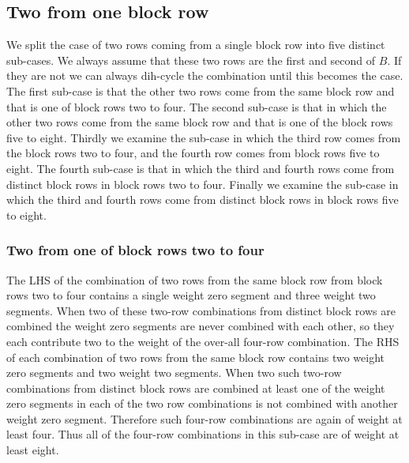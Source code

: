 \subsection{Two from one block row}
We split the case of two rows coming from a single block row into five distinct sub-cases.
We always assume that these two rows are the first and second of $B$.
If they are not we can always dih-cycle the combination until this becomes the case.
The first sub-case is that the other two rows come from the same block row and that is one of block rows two to four.
The second sub-case is that in which the other two rows come from the same block row and that is one of the block rows five to eight.
Thirdly we examine the sub-case in which the third row comes from the block rows two to four, and the fourth row comes from block rows five to eight.
The fourth sub-case is that in which the third and fourth rows come from distinct block rows in block rows two to four.
Finally we examine the sub-case in which the third and fourth rows come from distinct block rows in block rows five to eight.

\subsubsection{Two from one of block rows two to four}
The LHS of the combination of two rows from the same block row from block rows two to four contains a single weight zero segment and three weight two segments.
When two of these two-row combinations from distinct block rows are combined the weight zero segments are never combined with each other, so they each contribute two to the weight of the over-all four-row combination.
The RHS of each combination of two rows from the same block row contains two weight zero segments and two weight two segments.
When two such two-row combinations from distinct block rows are combined at least one of the weight zero segments in each of the two row combinations is not combined with another weight zero segment.
Therefore such four-row combinations are again of weight at least four.
Thus all of the four-row combinations in this sub-case are of weight at least eight.

